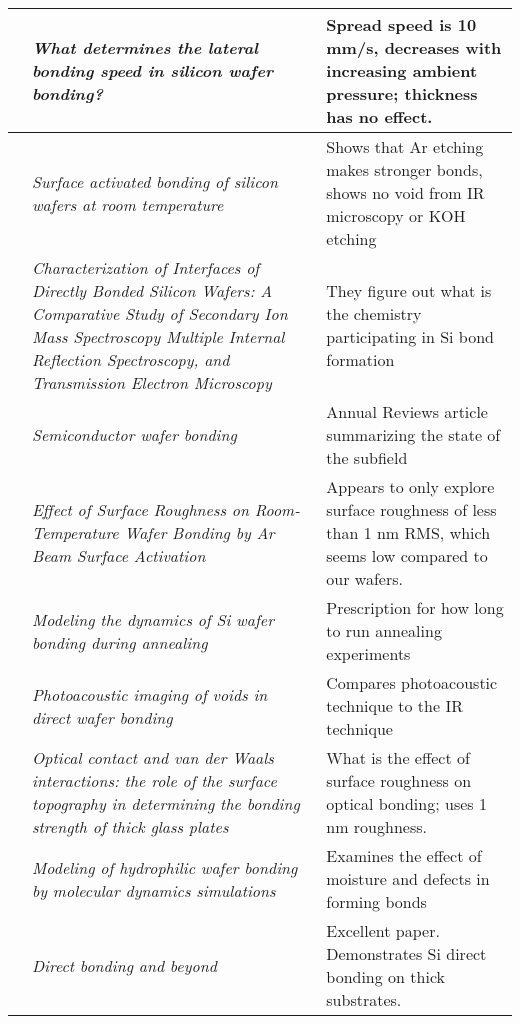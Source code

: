 \documentclass[osajnl,preprint,showpacs,superscriptaddress,12pt]{revtex4-1} %
\begin{document}
\begin{spacing}{1.0}
\begin{center}
\begin{longtable}{ |c | p{8cm} | p{8cm} |}
              \hline     
     \cite{1995ApPhL..67..863G} &  \emph{What determines the lateral bonding speed in silicon wafer bonding?} &  Spread speed is 10 mm/s, decreases with increasing ambient pressure; thickness has no effect.  \\
              \hline
     \cite{1996ApPhL..68.2222T} &  \emph{Surface activated bonding of silicon wafers at room temperature} &  Shows that Ar etching makes stronger bonds, shows no void from IR microscopy or KOH etching  \\     
              \hline
     \cite{1996JaJAP..35.2102R} &  \emph{Characterization of Interfaces of Directly Bonded Silicon Wafers: A Comparative Study of Secondary Ion Mass Spectroscopy Multiple Internal Reflection Spectroscopy, and Transmission Electron Microscopy} &  They figure out what is the chemistry participating in Si bond formation\\               
              \hline
     \cite{1998AnRMS..28..215G} &  \emph{Semiconductor wafer bonding} &  Annual Reviews article summarizing the state of the subfield\\ 
              \hline
     \cite{JJAP.37.4197} &  \emph{Effect of Surface Roughness on Room-Temperature Wafer Bonding by Ar Beam Surface Activation} &  Appears to only explore surface roughness of less than 1 nm RMS, which seems low compared to our wafers.\\ 
              \hline
     \cite{2000JAP....88.4404H} &  \emph{Modeling the dynamics of Si wafer bonding during annealing} &  Prescription for how long to run annealing experiments\\     
              \hline
     \cite{2000RScI...71.1869G} &  \emph{Photoacoustic imaging of voids in direct wafer bonding} &  Compares photoacoustic technique to the IR technique \\     
              \hline
     \cite{2001JOptA...3...85G} &  \emph{Optical contact and van der Waals interactions: the role of the surface topography in determining the bonding strength of thick glass plates} &  What is the effect of surface roughness on optical bonding; uses 1 nm roughness.\\
              \hline
     \cite{2001JAP....89.6013L} &  \emph{Modeling of hydrophilic wafer bonding by molecular dynamics simulations} &  Examines the effect of moisture and defects in forming bonds\\ 
          \cite{2007ApOpt..46.6793H} &  \emph{Direct bonding and beyond} &  Excellent paper.  Demonstrates Si direct bonding on thick substrates.\\ 

    \hline
\end{longtable}
\end{center}

\end{spacing} 
\end{document}
